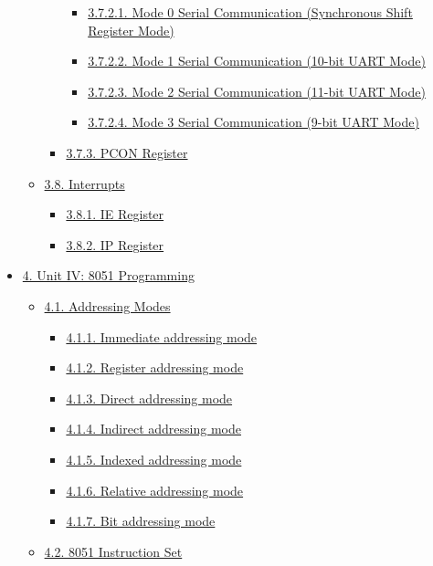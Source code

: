 \documentclass[
]{article}
\begin{document}
\begin{itemize}
\begin{itemize}
\begin{itemize}
      \begin{itemize}
      \item
        \protect\hyperlink{3721-mode-0-serial-communication-synchronous-shift-register-mode}{3.7.2.1.
        Mode 0 Serial Communication (Synchronous Shift Register Mode)}
      \item
        \protect\hyperlink{3722-mode-1-serial-communication-10-bit-uart-mode}{3.7.2.2.
        Mode 1 Serial Communication (10-bit UART Mode)}
      \item
        \protect\hyperlink{3723-mode-2-serial-communication-11-bit-uart-mode}{3.7.2.3.
        Mode 2 Serial Communication (11-bit UART Mode)}
      \item
        \protect\hyperlink{3724-mode-3-serial-communication-9-bit-uart-mode}{3.7.2.4.
        Mode 3 Serial Communication (9-bit UART Mode)}
      \end{itemize}
    \item
      \protect\hyperlink{373-pcon-register}{3.7.3. PCON Register}
    \end{itemize}
  \item
    \protect\hyperlink{38-interrupts}{3.8. Interrupts}

    \begin{itemize}
    \item
      \protect\hyperlink{381-ie-register}{3.8.1. IE Register}
    \item
      \protect\hyperlink{382-ip-register}{3.8.2. IP Register}
    \end{itemize}
  \end{itemize}
\item
  \protect\hyperlink{4-unit-iv-8051-programming}{4. Unit IV: 8051
  Programming}

  \begin{itemize}
  \item
    \protect\hyperlink{41-addressing-modes}{4.1. Addressing Modes}

    \begin{itemize}
    \item
      \protect\hyperlink{411-immediate-addressing-mode}{4.1.1. Immediate
      addressing mode}
    \item
      \protect\hyperlink{412-register-addressing-mode}{4.1.2. Register
      addressing mode}
    \item
      \protect\hyperlink{413-direct-addressing-mode}{4.1.3. Direct
      addressing mode}
    \item
      \protect\hyperlink{414-indirect-addressing-mode}{4.1.4. Indirect
      addressing mode}
    \item
      \protect\hyperlink{415-indexed-addressing-mode}{4.1.5. Indexed
      addressing mode}
    \item
      \protect\hyperlink{416-relative-addressing-mode}{4.1.6. Relative
      addressing mode}
    \item
      \protect\hyperlink{417-bit-addressing-mode}{4.1.7. Bit addressing
      mode}
    \end{itemize}
  \item
    \protect\hyperlink{42-8051-instruction-set}{4.2. 8051 Instruction
    Set}


\end{itemize}
\end{itemize}
\end{document}
